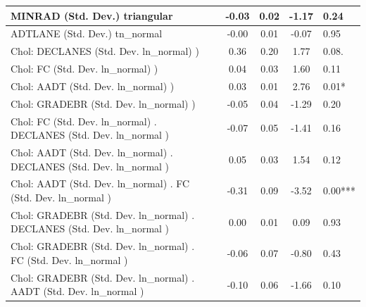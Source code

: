 \begin{table}
\begin{center}
\begin{tabular}{|l|l|c|c|c|l|}
			\hline
			MINRAD (Std. Dev.) triangular &  & -0.03 & 0.02 & -1.17 & 0.24 \\
			\hline
			ADTLANE (Std. Dev.) tn_normal &  & -0.00 & 0.01 & -0.07 & 0.95 \\
			\hline
			 Chol: DECLANES (Std. Dev. ln_normal) ) &  & 0.36 & 0.20 & 1.77 & 0.08. \\
			\hline
			 Chol: FC (Std. Dev. ln_normal) ) &  & 0.04 & 0.03 & 1.60 & 0.11 \\
			\hline
			 Chol: AADT (Std. Dev. ln_normal) ) &  & 0.03 & 0.01 & 2.76 & 0.01* \\
			\hline
			 Chol: GRADEBR (Std. Dev. ln_normal) ) &  & -0.05 & 0.04 & -1.29 & 0.20 \\
			\hline
			 Chol: FC (Std. Dev. ln_normal) . DECLANES (Std. Dev.   ln_normal ) &  & -0.07 & 0.05 & -1.41 & 0.16 \\
			\hline
			 Chol: AADT (Std. Dev. ln_normal) . DECLANES (Std. Dev.   ln_normal ) &  & 0.05 & 0.03 & 1.54 & 0.12 \\
			\hline
			 Chol: AADT (Std. Dev. ln_normal) . FC (Std. Dev.   ln_normal ) &  & -0.31 & 0.09 & -3.52 & 0.00*** \\
			\hline
			 Chol: GRADEBR (Std. Dev. ln_normal) . DECLANES (Std. Dev.   ln_normal ) &  & 0.00 & 0.01 & 0.09 & 0.93 \\
			\hline
			 Chol: GRADEBR (Std. Dev. ln_normal) . FC (Std. Dev.   ln_normal ) &  & -0.06 & 0.07 & -0.80 & 0.43 \\
			\hline
			 Chol: GRADEBR (Std. Dev. ln_normal) . AADT (Std. Dev.   ln_normal ) &  & -0.10 & 0.06 & -1.66 & 0.10 \\
			\hline
		\end{tabular}
	\end{center}
\end{table}